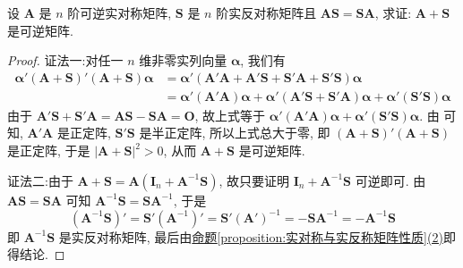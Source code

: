 \documentclass[../../main.tex]{subfiles}
\begin{document}
\begin{proposition}\label{proposition:可逆实对称与实反称阵可交换则相加也可逆}
设 \(\boldsymbol{A}\) 是 \(n\) 阶可逆实对称矩阵, \(\boldsymbol{S}\) 是 \(n\) 阶实反对称矩阵且 \(\boldsymbol{A}\boldsymbol{S}=\boldsymbol{S}\boldsymbol{A}\), 求证: \(\boldsymbol{A}+\boldsymbol{S}\) 是可逆矩阵.
\end{proposition}
\begin{proof}
{\color{blue}证法一:}对任一 \(n\) 维非零实列向量 \(\boldsymbol{\alpha}\), 我们有
\begin{align*}
\boldsymbol{\alpha}'(\boldsymbol{A}+\boldsymbol{S})'(\boldsymbol{A}+\boldsymbol{S})\boldsymbol{\alpha}&=\boldsymbol{\alpha}'(\boldsymbol{A}'\boldsymbol{A}+\boldsymbol{A}'\boldsymbol{S}+\boldsymbol{S}'\boldsymbol{A}+\boldsymbol{S}'\boldsymbol{S})\boldsymbol{\alpha}\\
&=\boldsymbol{\alpha}'(\boldsymbol{A}'\boldsymbol{A})\boldsymbol{\alpha}+\boldsymbol{\alpha}'(\boldsymbol{A}'\boldsymbol{S}+\boldsymbol{S}'\boldsymbol{A})\boldsymbol{\alpha}+\boldsymbol{\alpha}'(\boldsymbol{S}'\boldsymbol{S})\boldsymbol{\alpha}
\end{align*}
由于 \(\boldsymbol{A}'\boldsymbol{S}+\boldsymbol{S}'\boldsymbol{A}=\boldsymbol{A}\boldsymbol{S}-\boldsymbol{S}\boldsymbol{A}=\boldsymbol{O}\), 故上式等于 \(\boldsymbol{\alpha}'(\boldsymbol{A}'\boldsymbol{A})\boldsymbol{\alpha}+\boldsymbol{\alpha}'(\boldsymbol{S}'\boldsymbol{S})\boldsymbol{\alpha}\). 由 可知, \(\boldsymbol{A}'\boldsymbol{A}\) 是正定阵, \(\boldsymbol{S}'\boldsymbol{S}\) 是半正定阵, 所以上式总大于零, 即 \((\boldsymbol{A}+\boldsymbol{S})'(\boldsymbol{A}+\boldsymbol{S})\) 是正定阵, 于是 \(|\boldsymbol{A}+\boldsymbol{S}|^2>0\), 从而 \(\boldsymbol{A}+\boldsymbol{S}\) 是可逆矩阵.

{\color{blue}证法二:}由于 \(\boldsymbol{A}+\boldsymbol{S}=\boldsymbol{A}(\boldsymbol{I}_n+\boldsymbol{A}^{-1}\boldsymbol{S})\), 故只要证明 \(\boldsymbol{I}_n+\boldsymbol{A}^{-1}\boldsymbol{S}\) 可逆即可. 由 \(\boldsymbol{A}\boldsymbol{S}=\boldsymbol{S}\boldsymbol{A}\) 可知 \(\boldsymbol{A}^{-1}\boldsymbol{S}=\boldsymbol{S}\boldsymbol{A}^{-1}\), 于是
\[
(\boldsymbol{A}^{-1}\boldsymbol{S})'=\boldsymbol{S}'(\boldsymbol{A}^{-1})'=\boldsymbol{S}'(\boldsymbol{A}')^{-1}=-\boldsymbol{S}\boldsymbol{A}^{-1}=-\boldsymbol{A}^{-1}\boldsymbol{S}
\]
即 \(\boldsymbol{A}^{-1}\boldsymbol{S}\) 是实反对称矩阵, 最后由\hyperref[proposition:实对称与实反称矩阵性质]{命题\ref{proposition:实对称与实反称矩阵性质}(2)}即得结论.
\end{proof}
\end{document}
